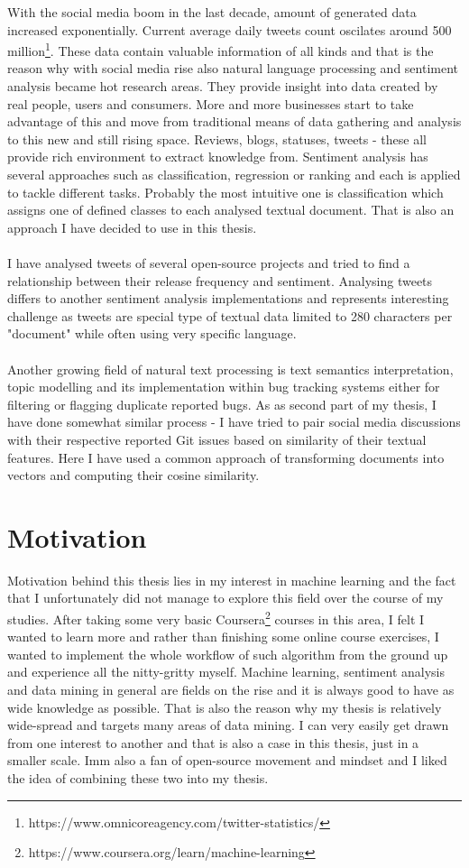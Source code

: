 With the social media boom in the last decade, amount of generated data increased exponentially. Current average daily tweets count oscilates around 500 million\footnote{https://www.omnicoreagency.com/twitter-statistics/}. These data contain valuable information of all kinds and that is the reason why with social media rise also natural language processing and sentiment analysis became hot research areas. They provide insight into data created by real people, users and consumers. More and more businesses start to take advantage of this and move from traditional means of data gathering and analysis to this new and still rising space. Reviews, blogs, statuses, tweets - these all provide rich environment to extract knowledge from.
Sentiment analysis has several approaches such as classification, regression or ranking and each is applied to tackle different tasks. Probably the most intuitive one is classification which assigns one of defined classes to each analysed textual document. That is also an approach I have decided to use in this thesis. \\
\\
I have analysed tweets of several open-source projects and tried to find a relationship between their release frequency and sentiment. Analysing tweets differs to another sentiment analysis implementations and represents interesting challenge as tweets are special type of textual data limited to 280 characters per "document" while often using very specific language.\\
\\
Another growing field of natural text processing is text semantics interpretation, topic modelling and its implementation within bug tracking systems either for filtering or flagging duplicate reported bugs. As as second part of my thesis, I have done somewhat similar process - I have tried to pair social media discussions with their respective reported Git issues based on similarity of their textual features. Here I have used a common approach of transforming documents into vectors and computing their cosine similarity.

\section{Motivation}
Motivation behind this thesis lies in my interest in machine learning and the fact that I unfortunately did not manage to explore this field over the course of my studies. After taking some very basic Coursera\footnote{https://www.coursera.org/learn/machine-learning} courses in this area, I felt I wanted to learn more and rather than finishing some online course exercises, I wanted to implement the whole workflow of such algorithm from the ground up and experience all the nitty-gritty myself. Machine learning, sentiment analysis and data mining in general are fields on the rise and it is always good to have as wide knowledge as possible. That is also the reason why my thesis is relatively wide-spread and targets many areas of data mining. I can very easily get drawn from one interest to another and that is also a case in this thesis, just in a smaller scale. Imm also a fan of open-source movement and mindset and I liked the idea of combining these two into my thesis.